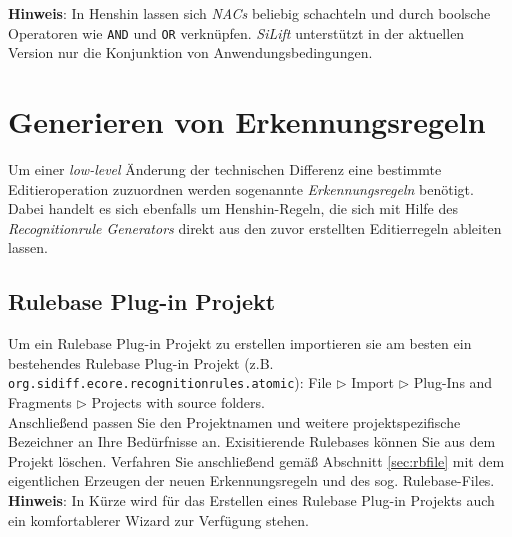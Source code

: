 \documentclass[a4paper]{scrartcl}
\begin{document}
\textbf{Hinweis}: In Henshin lassen sich \textit{NACs} beliebig schachteln und durch boolsche Operatoren wie \texttt{AND} und \texttt{OR} verknüpfen. \textit{SiLift} unterstützt in der aktuellen Version nur die Konjunktion von Anwendungsbedingungen.


\section{Generieren von Erkennungsregeln}

Um einer \textit{low-level} Änderung der technischen Differenz eine bestimmte Editieroperation zuzuordnen werden sogenannte \textit{Erkennungsregeln} benötigt. 
Dabei handelt es sich ebenfalls um Henshin-Regeln, die sich mit Hilfe des \textit{Recognitionrule Generators} direkt aus den zuvor erstellten Editierregeln ableiten lassen.


\subsection{Rulebase Plug-in Projekt}

Um ein Rulebase Plug-in Projekt zu erstellen importieren sie am besten ein bestehendes Rulebase Plug-in Projekt (z.B. \texttt{org.sidiff.ecore.recognitionrules.atomic}): File $\triangleright$ Import $\triangleright$ Plug-Ins and Fragments $\triangleright$ Projects with source folders.\\
Anschließend passen Sie den Projektnamen und weitere projektspezifische Bezeichner an Ihre Bedürfnisse an. Exisitierende Rulebases können Sie aus dem Projekt löschen. Verfahren Sie anschließend gemäß Abschnitt \ref{sec:rbfile} mit dem eigentlichen Erzeugen der neuen Erkennungsregeln und des sog. Rulebase-Files.\\

\textbf{Hinweis}: In Kürze wird für das Erstellen eines Rulebase Plug-in Projekts auch ein komfortablerer Wizard zur Verfügung stehen.
\end{document}
